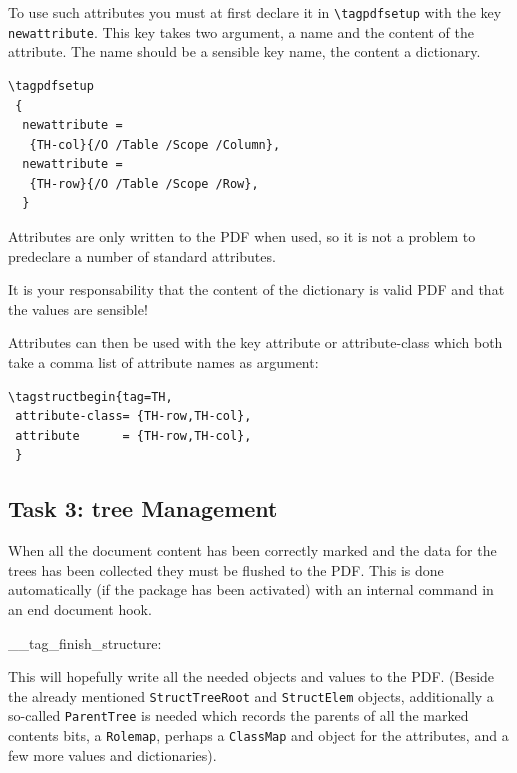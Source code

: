 \documentclass[DIV=12,parskip=half-,bibliography=totoc]{scrartcl}
\newcommand\PrintKeyName[1]{\textsf{#1}}
\newcommand\PDF{PDF}
\begin{document}
To use such attributes you must at first declare it in \verb+\tagpdfsetup+ with the key \texttt{newattribute}. This key takes two argument, a name and the content of the attribute.
The name should be a sensible key name, the content a dictionary.



\begin{lstlisting}
\tagpdfsetup
 {
  newattribute =
   {TH-col}{/O /Table /Scope /Column},
  newattribute =
   {TH-row}{/O /Table /Scope /Row},
  }
\end{lstlisting}



Attributes are only written to the \PDF{} when used, so it is not a problem to predeclare a number of standard attributes.


It is your responsability that the content of the dictionary is valid \PDF{} and that the values are sensible!


Attributes can then be used with the key \PrintKeyName{attribute} or \PrintKeyName{attribute-class} which both take a comma list of attribute names as argument:




\begin{lstlisting}
\tagstructbegin{tag=TH,
 attribute-class= {TH-row,TH-col},
 attribute      = {TH-row,TH-col},
 }
\end{lstlisting}



\subsection{Task 3: tree Management}

When all the document content has been correctly marked and the data for the trees has been collected they must be flushed to the \PDF{}. This is done automatically (if the package has been activated) with an internal command in an end document hook.

\begin{docCommand}{__tag_finish_structure:}{}\end{docCommand}

This will hopefully write all the needed objects and values to the \PDF{}. (Beside the already mentioned  \texttt{StructTreeRoot} and \texttt{StructElem} objects, additionally a so-called \texttt{ParentTree} is needed which records the parents of all the marked contents bits, a \texttt{Rolemap}, perhaps a \texttt{ClassMap} and object for the attributes, and a few more values and dictionaries).
\end{document}
